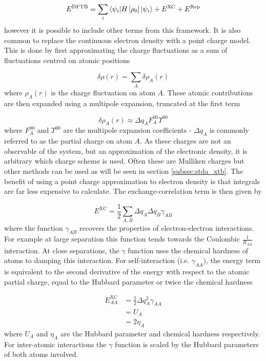 \begin{equation}
    \label{eq:dftb_energies}
    E^{\text{DFTB}} = \sum_i \braket{\psi_i|H_{} \left[ \rho_0 \right]|\psi_i} + E^\text{XC} + E^\text{Rep}
\end{equation}
%
however it is possible to include other terms from this framework. It is also common
to replace the continuous electron density with a point charge model. This is done
by first approximating the charge fluctuations as a sum of fluctuations centred 
on atomic positions

\begin{equation}
    \delta \rho\left(r\right) = \sum_A \delta \rho_A \left(r\right)
\end{equation}
%
where $\rho_A \left(r\right)$ is the charge fluctuation on atom $A$. These atomic
contributions are then expanded using a multipole expansion, truncated at the first
term

\begin{equation}
    \delta \rho_A \left(r\right) \approx \Delta q_A F_A^{00} \Upsilon^{00}
\end{equation}
%
where $F_A^{00}$ and $\Upsilon^{00}$ are the multipole expansion coefficients - 
$\Delta q_A$ is commonly referred to as the partial charge on atom $A$. As these
charges are not an observable of the system, but an approximation of the electronic
density, it is arbitrary which charge scheme is used. Often these are Mulliken charges 
but other methods can be used as will be seen in section \ref{subsec:stda_xtb}. 
The benefit of using a point charge approximation to electron density is that integrals
are far less expensive to calculate. The exchange-correlation term is then given
by

\begin{equation}
    E^{\text{XC}} = \frac{1}{2}\sum_{A,B} \Delta q_A \Delta q_B \gamma_{AB}
\end{equation}
%
where the function $\gamma_{AB}$ recovers the properties of electron-electron interactions.
For example at large separation this function tends towards the Coulombic $\frac{1}{R_{AB}}$
interaction. At close separations, the $\gamma$ function uses the chemical hardness 
of atoms to damping this interaction. For self-interaction (i.e. $\gamma_{AA}$), 
the energy term is equivalent to the second derivative of the energy with respect
to the atomic partial charge, equal to the Hubbard parameter or twice the chemical
hardness 

\begin{equation}
    \begin{split}
    E^{\text{XC}}_{AA} &= \frac{1}{2} \Delta q_A^2 \gamma_{AA} \\
    &= U_{A} \\
    &= 2 \eta_A
    \end{split}
\end{equation}
%
where $U_A$ and $\eta_A$ are the Hubbard parameter and chemical hardness respectively.
For inter-atomic interactions the $\gamma$ function is scaled by the Hubbard parameters
of both atoms involved.

